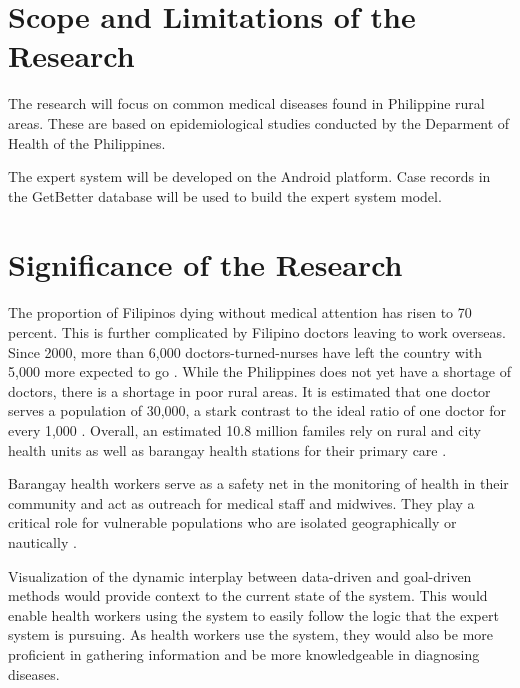 \section{Scope and Limitations of the Research}
\label{sec:scopelimitations}

The research will focus on common medical diseases found in Philippine rural areas. These are based on epidemiological studies conducted by the Deparment of Health of the Philippines.

The expert system will be developed on the Android platform. Case records in the GetBetter database will be used to build the expert system model. 

\section{Significance of the Research}
\label{sec:significance}

The proportion of Filipinos dying without medical attention has risen to 70 percent.
This is further complicated by Filipino doctors leaving to work overseas.
Since 2000, more than 6,000 doctors-turned-nurses have left the country with 5,000 more expected to go \cite{Harden:2008}.
While the Philippines does not yet have a shortage of doctors, there is a shortage in poor rural areas.
It is estimated that one doctor serves a population of 30,000, a stark contrast to the ideal ratio of one doctor for every 1,000 \cite{Manongdo:2014}.
Overall, an estimated 10.8 million familes rely on rural and city health units as well as barangay health stations for their primary care \cite{gmc:2013}.

Barangay health workers serve as a safety net in the monitoring of health in their community and act as outreach for medical staff and midwives.
They play a critical role for vulnerable populations who are isolated geographically or nautically \cite{DirectRelief:2014}.

Visualization of the dynamic interplay between data-driven and goal-driven methods would provide context to the current state of the system.
This would enable health workers using the system to easily follow the logic that the expert system is pursuing. 
As health workers use the system, they would also be more proficient in gathering information and be more knowledgeable in diagnosing diseases.
